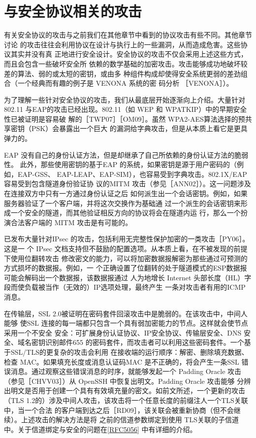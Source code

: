 \section{与安全协议相关的攻击}
有关安全协议的攻击与之前我们在其他章节中看到的协议攻击有些不同。其他章节讨论
的攻击往往会利用协议在设计与执行上的一些漏洞，从而造成危害。这些协议其实并没有真
正地进行安全设计。安全协议的攻击不仅会采用上述这些方式，而且会包含一些破坏安全所
依赖的数学基础的加密攻击。攻击能够成功地破坏较差的算法、弱的或太短的密钥，或由多
种组件构成却使得安全系统更弱的差劲组合（一个经典而有趣的例子是 VENONA 系统的密
码分析 ［VENONA］）。

为了理解一些针对安全协议的攻击，我们从最底层开始逐渐向上介绍。大量针对802.11
与EAP的攻击已经出现。802.11（如 WEP 和 WPATKIP）中的早期安全性已被证明是容易破
解的［TWP07］［OM09］。虽然 WPA2-AES算法选择的预共享密钥（PSK）会暴露出一个巨大
的漏洞给字典攻击，但是从本质上看它是更具弹力的。

EAP 没有自己的身份认证方法，但是却继承了自己所依赖的身份认证方法的脆弱性。
此外，那些使用密钥的基于EAP 的系统，如果密钥是源于用户密码的（例如，EAP-GSS、
EAP-LEAP、EAP-SIM），也容易受到字典攻击。802.1X/EAP 容易受到包含隧道身份验证协
议的MITM 攻击（参见［ANN02］）。这一问题涉及在连接双方中只有一方通过身份认证之后
如何派生出一个会话密钥。例如，如果服务器验证了一个客户端，并将这次交换作为基础通
过一个派生的会话密钥来形成一个安全的隧道，而其他验证相反方向的协议将会在隧道内运
行，那么一个扮演合法客户端的 MITM 攻击是有可能的。

已发布大量针对IPsec 的攻击，包括利用无完整性保护加密的一类攻击［PY06］。这是一
个 IPsec 文档支持但不鼓励的配置选项。从本质上看，在不被发现的前提下使用位翻转攻击
修改密文的能力，可以将加密数据报解密为那些通过可预测的方式损坏的数据报。例如，一
个正确设置了位翻转的处于隧道模式的ESP数据报可能会解码出一个数据报，该数据报通过
人为地增长 Internet 头部长度（HL）字段而使负载被当作（无效的）IP选项处理，最终产生
一条对攻击者有用的ICMP 消息。

在传输层，SSL 2.0被证明在密码套件回滚攻击中是脆弱的。在该攻击中，中间人能够
使SSL 连接的每一端都只包含一个具有弱加密能力的节点。这样就会使节点采用一个不安全
安全：可扩展身份认证协议、IP安全协议、传输层安全、DNS 安全、域名密钥识别邮件655
的密码套件，而攻击者可以利用这些密码套件。一个基于SSL/TLS的更复杂的攻击会利用
在接收端的运行顺序：解密、删除填充数据、检查 MAC。如果填充长度或消息认证码MAC
是不正确的，将会产生一条SSL 错误消息。通过观察这些错误消息的时序，就能够发起一个
Padding Oracle 攻击（参见［CHVV03］）从 OpenSSH 中恢复出明文。Padding Oracle 攻击能够
分辨出明文是否用于创建一个具有有效填充量的密文。如前文所述，一个更新的攻击（TLS
1.2的）涉及中间人攻击，该攻击将一个任意长度的前缀注人一个TLS关联中，当一个合法
的客户端到达之后［RD09］，该关联会被重新协商（但不会继续）。上述攻击的解决方法是将
之前的信道参数绑定到使用 TLS关联的子信道中。关于信道绑定与安全的问题在\href{https://www.rfc-editor.org/rfc/rfc5056}{[RFC5056]}
中有详细的介绍。

